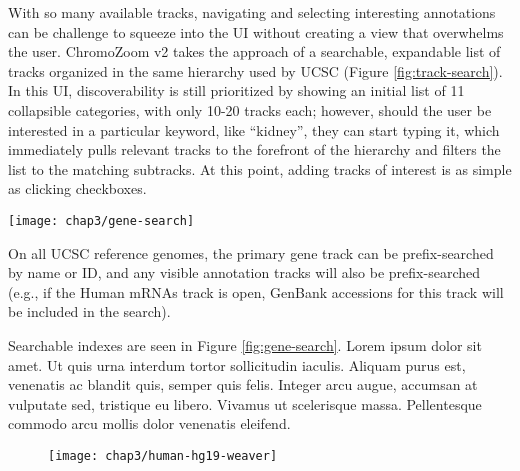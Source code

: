 With so many available tracks, navigating and selecting interesting annotations can be challenge to squeeze into the UI without creating a view that overwhelms the user. ChromoZoom v2 takes the approach of a searchable, expandable list of tracks organized in the same hierarchy used by UCSC (Figure \ref{fig:track-search}). In this UI, discoverability is still prioritized by showing an initial list of 11 collapsible categories, with only 10-20 tracks each; however, should the user be interested in a particular keyword, like ``kidney'', they can start typing it, which immediately pulls relevant tracks to the forefront of the hierarchy and filters the list to the matching subtracks. At this point, adding tracks of interest is as simple as clicking checkboxes.

\begin{marginfigure}
  \texttt{[image: chap3/gene-search]}               
  \caption[Searching for a gene by name.]{On all UCSC reference genomes, the primary gene track can be prefix-searched by name or ID, and any visible annotation tracks will also be prefix-searched (e.g., if the Human mRNAs track is open, GenBank accessions for this track will be included in the search).}
  \label{fig:gene-search}
\end{marginfigure}

Searchable indexes are seen in Figure \ref{fig:gene-search}. Lorem ipsum dolor sit amet. Ut quis urna interdum tortor sollicitudin iaculis. Aliquam purus est, venenatis ac blandit quis, semper quis felis. Integer arcu augue, accumsan at vulputate sed, tristique eu libero. Vivamus ut scelerisque massa. Pellentesque commodo arcu mollis dolor venenatis eleifend. 

\begin{figure*}[tbp]
  \texttt{[image: chap3/human-hg19-weaver]}               
\end{figure*}

